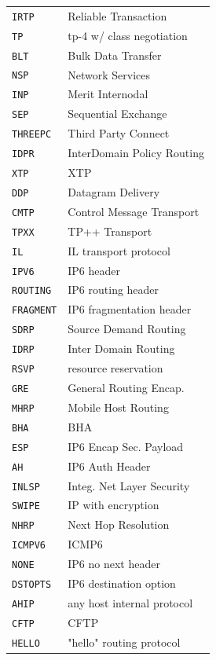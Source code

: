 \documentclass[10pt,a4paper,openany]{mudbook}
\begin{document}
\begin{longtable}{l|p{}}
  \texttt{IRTP} & Reliable Transaction \\
  \texttt{TP} & tp-4 w/ class negotiation \\
  \texttt{BLT} & Bulk Data Transfer \\
  \texttt{NSP} & Network Services \\
  \texttt{INP} & Merit Internodal \\
  \texttt{SEP} & Sequential Exchange \\
  \texttt{THREEPC} & Third Party Connect \\
  \texttt{IDPR} & InterDomain Policy Routing \\
  \texttt{XTP} & XTP \\
  \texttt{DDP} & Datagram Delivery \\
  \texttt{CMTP} & Control Message Transport \\
  \texttt{TPXX} & TP++ Transport \\
  \texttt{IL} & IL transport protocol \\
  \texttt{IPV6} & IP6 header \\
  \texttt{ROUTING} & IP6 routing header \\
  \texttt{FRAGMENT} & IP6 fragmentation header \\
  \texttt{SDRP} & Source Demand Routing \\
  \texttt{IDRP} & Inter Domain Routing \\
  \texttt{RSVP} & resource reservation \\
  \texttt{GRE} & General Routing Encap. \\
  \texttt{MHRP} & Mobile Host Routing \\
  \texttt{BHA} & BHA \\
  \texttt{ESP} & IP6 Encap Sec. Payload \\
  \texttt{AH} & IP6 Auth Header \\
  \texttt{INLSP} & Integ. Net Layer Security \\
  \texttt{SWIPE} & IP with encryption \\
  \texttt{NHRP} & Next Hop Resolution \\
  \texttt{ICMPV6} & ICMP6 \\
  \texttt{NONE} & IP6 no next header \\
  \texttt{DSTOPTS} & IP6 destination option \\
  \texttt{AHIP} & any host internal protocol \\
  \texttt{CFTP} & CFTP \\
  \texttt{HELLO} & "hello" routing protocol \\

\end{longtable}
\end{document}

